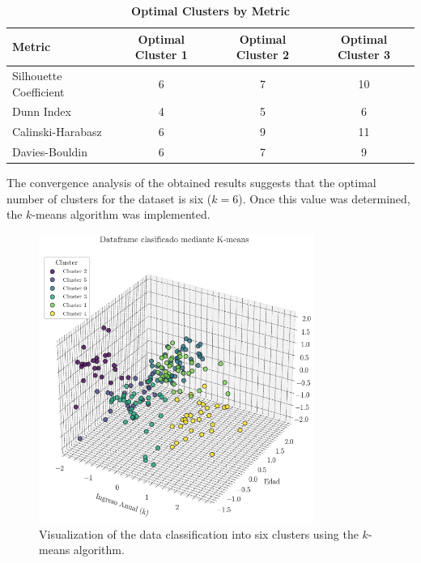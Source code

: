 \documentclass[10pt]{article}
\begin{document}
\begin{table}[h]
    \centering
    \caption{\textbf{Optimal Clusters by Metric}}
    \label{tab:clusters_optimos}
    \renewcommand{\arraystretch}{1.2}
    \begin{tabular}{@{}lccc@{}}
        \toprule
        \textbf{Metric}         & \textbf{Optimal Cluster 1} & \textbf{Optimal Cluster 2} & \textbf{Optimal Cluster 3} \\
        \midrule
        Silhouette Coefficient  & 6                        & 7                        & 10                       \\
        Dunn Index              & 4                        & 5                        & 6                        \\
        Calinski-Harabasz       & 6                        & 9                        & 11                       \\
        Davies-Bouldin          & 6                        & 7                        & 9                        \\
        \bottomrule
    \end{tabular}
\end{table}

The convergence analysis of the obtained results suggests that the optimal number of clusters for the dataset is six (\( k = 6 \)). Once this value was determined, the \( k \)-means algorithm was implemented.

\begin{figure}[h]
    \centering
    \includegraphics[width=0.8\textwidth]{plots_investing/Grafico 8.png}
    \caption{Visualization of the data classification into six clusters using the \( k \)-means algorithm.}
    \label{fig:miGrafico8}
\end{figure}
\end{document}
